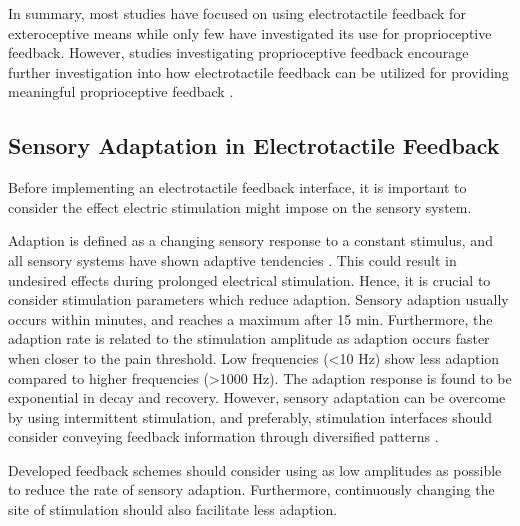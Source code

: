 In summary, most studies have focused on using electrotactile feedback for exteroceptive means while only few have investigated its use for proprioceptive feedback. However, studies investigating proprioceptive feedback encourage further investigation into how electrotactile feedback can be utilized for providing meaningful proprioceptive feedback \cite{Strbac2016}.    

\subsection{Sensory Adaptation in Electrotactile Feedback}

Before implementing an electrotactile feedback interface, it is important to consider the effect electric stimulation might impose on the sensory system. 

Adaption is defined as a changing sensory response to a constant stimulus, and all sensory systems have shown adaptive tendencies \cite{Buma2007}. This could result in undesired effects during prolonged electrical stimulation. Hence, it is crucial to consider stimulation parameters which reduce adaption. Sensory adaption usually occurs within minutes, and reaches a maximum after 15 min. Furthermore, the adaption rate is related to the stimulation amplitude as adaption occurs faster when closer to the pain threshold. Low frequencies (<10 Hz) show less adaption compared to higher frequencies (>1000 Hz). The adaption response is found to be exponential in decay and recovery. \cite{Buma2007,Szeto1982} 
However, sensory adaptation can be overcome by using intermittent stimulation, and preferably, stimulation interfaces should consider conveying feedback information through diversified patterns \cite{Szeto1982,Dosen2016}. 

Developed feedback schemes should consider using as low amplitudes as possible to reduce the rate of sensory adaption. Furthermore, continuously changing the site of stimulation should also facilitate less adaption. 



